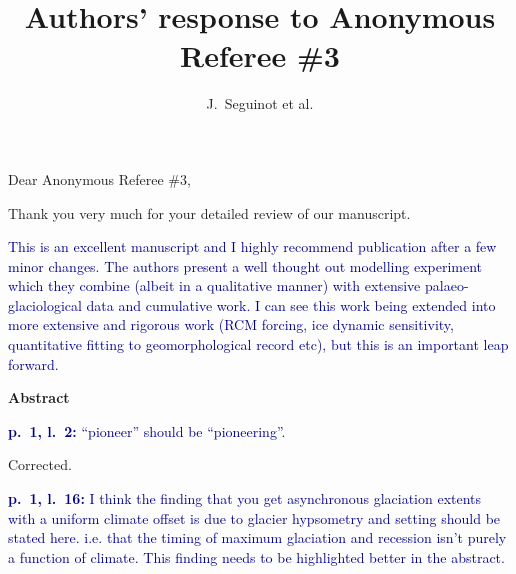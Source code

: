 

\title{Authors' response to Anonymous Referee \#3}
\author{J.~Seguinot et al.}


\maketitle
\bigskip


\newcommand{\sechead}[1]{\bigskip\noindent\textbf{#1}}
\newcommand{\referee}[1]{\bigskip\noindent\textcolor{darkblue}{#1}}
\newcommand{\msquote}[1]{\begin{quote}\textit{#1}\end{quote}}
\newcommand{\doi}[1]{doi:\allowbreak\href{http://dx.doi.org/#1}{#1}}

Dear Anonymous Referee \#3,

Thank you very much for your detailed review of our manuscript.

    \referee{%
        This is an excellent manuscript and I highly recommend publication
        after a few minor changes. The authors present a well thought out
        modelling experiment which they combine (albeit in a qualitative
        manner) with extensive palaeo-glaciological data and cumulative work. I
        can see this work being extended into more extensive and rigorous work
        (RCM forcing, ice dynamic sensitivity, quantitative fitting to
        geomorphological record etc), but this is an important leap forward.}


\sechead{Abstract}

    \referee{\textbf{p.~1, l.~2:}
        ``pioneer'' should be ``pioneering''.}

        Corrected.

    \referee{\textbf{p.~1, l.~16:}
        I think the finding that
        you get asynchronous glaciation extents with a uniform climate offset
        is due to glacier hypsometry and setting should be stated here. i.e.
        that the timing of maximum glaciation and recession isn't purely a
        function of climate. This finding needs to be highlighted better in the
        abstract.}

